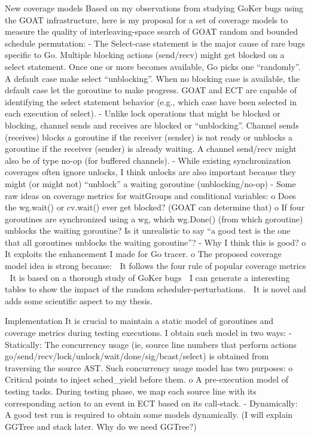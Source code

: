 New coverage models
Based on my observations from studying GoKer bugs using the GOAT infrastructure, here is my proposal for a set of coverage models to measure the quality of interleaving-space search of GOAT random and bounded schedule permutation:
-	The Select-case statement is the major cause of rare bugs specific to Go. Multiple blocking actions (send/recv) might get blocked on a select statement. Once one or more becomes available, Go picks one “randomly”. A default case make select “unblocking”. When no blocking case is available, the default case let the goroutine to make progress. GOAT and ECT are capable of identifying the select statement behavior (e.g., which case have been selected in each execution of select).
-	Unlike lock operations that might be blocked  or blocking, channel sends and receives are blocked or “unblocking”. Channel sends (receives) blocks a goroutine if the receiver (sender) is not ready or unblocks a goroutine if the receiver (sender) is already waiting. A channel send/recv might also be of type no-op (for buffered channels).
-	While existing synchronization coverages often ignore unlocks, I think unlocks are also important because they might (or might not) “unblock” a waiting goroutine (unblocking/no-op)
-	Some raw ideas on coverage metrics for waitGroups and conditional variables:
o	Does the wg.wait() or cv.wait() ever get blocked? (GOAT can determine that)
o	If four goroutines are synchronized using a wg, which wg.Done() (from which goroutine) unblocks the waiting goroutine? Is it unrealistic to say “a good test is the one that all goroutines unblocks the waiting goroutine”?
-	Why I think this is good?
o	It exploits the enhancement I made for Go tracer.
o	The proposed coverage model idea is strong because:
	It follows the four rule of popular coverage metrics
	It is based on a thorough study of GoKer bugs
	I can generate a interesting tables to show the impact of the random scheduler-perturbations.
	It is novel and adds some scientific aspect to my thesis.

Implementation
It is crucial to maintain a static model of goroutines and coverage metrics during testing executions. I obtain such model in two ways:
-	Statically: The concurrency usage (ie, source line numbers that perform actions go/send/recv/lock/unlock/wait/done/sig/bcast/select) is obtained from traversing the source AST. Such concurrency usage model has two purposes:
o	Critical points to inject sched_yield before them.
o	A pre-execution model of testing tasks. During testing phase, we map each source line with its corresponding action to an event in ECT based on its call-stack.
-	Dynamically: A good test run is required to obtain some models dynamically. (I will explain GGTree and stack later. Why do we need GGTree?)
